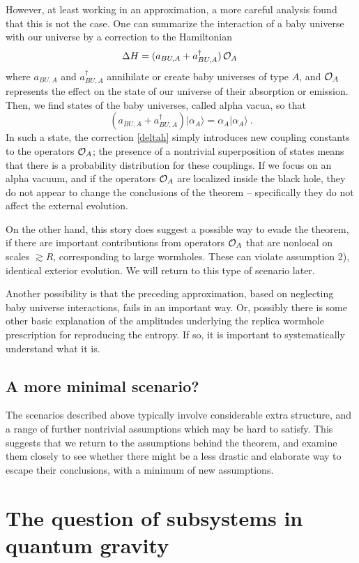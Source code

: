\documentclass[12pt]{article}
\numberwithin{equation}{section}
\newcommand{\calo}{{\cal O}}
\newcommand{\beq}{\begin{equation}}
\newcommand{\eeq}{\end{equation}}
\begin{document}
However, at least working in an approximation, a more careful analysis\cite{Cole,GiStinc} found that this is not the case.  One can summarize the interaction of a baby universe with our universe by a correction to the Hamiltonian
\beq\label{deltah}
\Delta H = (a_{BU,A}+a_{BU,A}^\dagger) \, {\cal O}_A\ 
\eeq
where $a_{BU,A}$ and $a_{BU,A}^\dagger$ annihilate or create baby universes of type $A$, and $\calo_A$ represents the effect on the state of our universe of their absorption or emission.  Then, we find states of the baby universes, called alpha vacua, so that
\beq
(a_{BU,A}+a_{BU,A}^\dagger)|\alpha_A\rangle=\alpha_A|\alpha_A\rangle\ .
\eeq
In such a state, the correction \eqref{deltah} simply introduces new coupling constants to the operators $\calo_A$; the presence of a nontrivial superposition of states means that there is a probability distribution for these couplings.  If we focus on an alpha vacuum, and if the operators $\calo_A$ are localized inside the black hole, they do not appear to change the conclusions of the theorem -- specifically they do not affect the external evolution.  

On the other hand, this story does suggest a possible way to evade the theorem, if there are important contributions from operators $\calo_A$ that are nonlocal on scales $\gtrsim R$, corresponding to large wormholes.  These can violate assumption 2), identical exterior evolution.  We will return to this type of scenario later.

Another possibility is that the preceding approximation, based on neglecting baby universe interactions, fails in an important way.  Or, possibly there is some other basic explanation of the amplitudes underlying the replica wormhole prescription for reproducing the entropy.  If so, it is important to systematically understand what it is.

\subsection{A more minimal scenario?}

The scenarios described above typically involve considerable extra structure, and a range of further nontrivial assumptions which may be hard to satisfy.  This suggests that we return to the assumptions behind the theorem, and examine them closely to see whether there might be a less drastic and elaborate way to escape their conclusions, with a minimum of new assumptions.

\section{The question of subsystems in quantum gravity}
\end{document}
